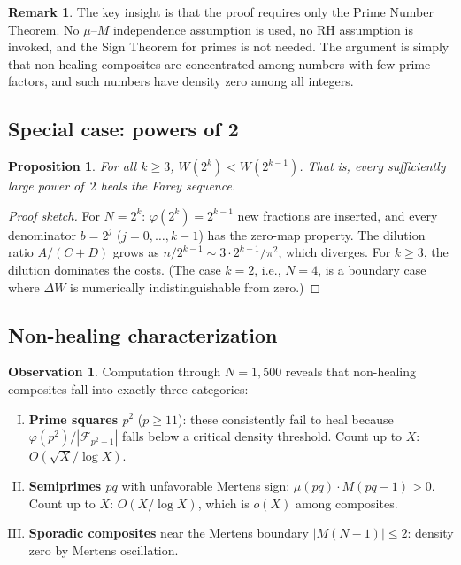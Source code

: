 \documentclass[11pt]{article}
\newtheorem{proposition}[theorem]{Proposition}
\theoremstyle{definition}
\newtheorem{remark}[theorem]{Remark}
\newtheorem{observation}[theorem]{Observation}
\newcommand{\F}{\mathcal{F}}
\begin{document}
\begin{remark}
The key insight is that the proof requires only the Prime Number
Theorem.  No $\mu$--$M$ independence assumption is used, no RH
assumption is invoked, and the Sign Theorem for primes is not needed.
The argument is simply that non-healing composites are concentrated
among numbers with few prime factors, and such numbers have
density zero among all integers.
\end{remark}

\subsection{Special case: powers of 2}\label{sec:powers-of-2}

\begin{proposition}\label{prop:powers-of-2}
For all $k \ge 3$, $W(2^k) < W(2^{k-1})$.  That is, every sufficiently
large power of~$2$ heals the Farey sequence.
\end{proposition}

\begin{proof}[Proof sketch]
For $N = 2^k$: $\varphi(2^k) = 2^{k-1}$ new fractions are inserted,
and every denominator $b = 2^j$ ($j = 0, \ldots, k-1$) has the
zero-map property.  The dilution ratio $A/(C + D)$ grows as
$n/2^{k-1} \sim 3 \cdot 2^{k-1}/\pi^2$, which diverges.
For $k \ge 3$, the dilution dominates the costs.
(The case $k = 2$, i.e., $N = 4$, is a boundary case where
$\Delta W$ is numerically indistinguishable from zero.)
\end{proof}

\subsection{Non-healing characterization}\label{sec:non-healing-class}

\begin{observation}\label{obs:non-healing}
Computation through $N = 1{,}500$ reveals that non-healing composites
fall into exactly three categories:
\begin{enumerate}[(I)]
  \item \textbf{Prime squares $p^2$} ($p \ge 11$): these consistently
    fail to heal because $\varphi(p^2)/|\F_{p^2-1}|$ falls below
    a critical density threshold.  Count up to $X$: $O(\sqrt{X}/\log X)$.
  \item \textbf{Semiprimes $pq$} with unfavorable Mertens sign:
    $\mu(pq) \cdot M(pq-1) > 0$.  Count up to $X$: $O(X/\log X)$,
    which is $o(X)$ among composites.
  \item \textbf{Sporadic composites} near the Mertens boundary
    $|M(N-1)| \le 2$: density zero by Mertens oscillation.
\end{enumerate}
\end{observation}
\end{document}
